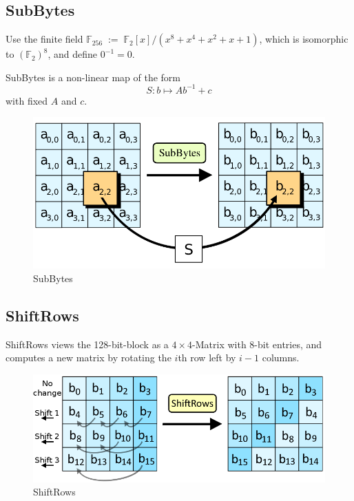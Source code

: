 \documentclass[a4paper]{scrartcl}
\newcommand\F{\mathbb F}
\begin{document}
\FloatBarrier

\subsection{SubBytes}

Use the finite field $\F_{256}\;:=\;\F_2[x]/(x^8+x^4+x^2+x+1)$, which is isomorphic to $(\F_2)^8$,
and define $0^{-1} = 0$.

SubBytes is a non-linear map of the form
\[S:b\mapsto Ab^{-1}+c\]
with fixed $A$ and $c$.

\begin{figure}
    \centering
    \includegraphics[scale=0.25]{images/subbytes.png}
    \caption{SubBytes}
\end{figure}

\subsection{ShiftRows}

ShiftRows views the 128-bit-block as a $4\times4$-Matrix with 8-bit entries,
and computes a new matrix by rotating the $i$th row left by $i-1$ columns.

\begin{figure}
    \centering
    \includegraphics[scale=0.3]{images/shiftrows.png}
    \caption{ShiftRows}
\end{figure}
\end{document}
